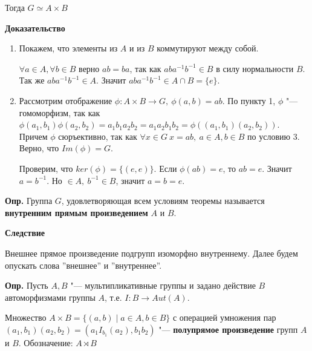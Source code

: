 \documentclass{article}
\begin{document}
Тогда $G \simeq A \times B$

\textbf{Доказательство}
\begin{enumerate}
	\item Покажем, что элементы из $A$ и из $B$ коммутируют между собой.
	
	$\forall a \in A, \forall b \in B$ верно $ab = ba$, так как $aba^{-1}b^{-1} \in B$ в силу нормальности $B$. Так же $aba^{-1}b^{-1} \in A$. Значит $aba^{-1}b^{-1} \in A \cap B = \{e\}$.
	
	\item Рассмотрим отображение $\phi: A \times B \rightarrow G, \  \phi(a,b) = ab$. По пункту 1, $\phi$ "--- гомоморфизм, так как $\phi(a_1, b_1)\phi(a_2, b_2) = a_1b_1a_2b_2 = a_1a_2b_1b_2 = \phi((a_1, b_1)(a_2, b_2))$. Причем $\phi$ сюръективно, так как $\forall x \in G \  x = ab, \  a \in A, b \in B$ по условию 3. Верно, что $Im(\phi) = G$.

	Проверим, что $ker(\phi) = \{(e, e)\}$. Если $\phi(ab) = e$, то $ab = e$. Значит $a = b^{-1}$. Но $ \in A, \   b^{-1} \in B$, значит $a = b = e$.
\end{enumerate}

\vspace{10pt}

\textbf{Опр.} Группа $G$, удовлетворяющая всем условиям теоремы называется \textbf{внутренним прямым произведением} $A$ и $B$.

\vspace{10pt}

\textbf{Следствие}

Внешнее прямое произведение подгрупп изоморфно внутреннему. Далее будем опускать слова ''внешнее'' и ''внутреннее''.

\textbf{Опр.} Пусть $A, B$ "--- мультипликативные группы и задано действие $B$ автоморфизмами группы $A$, т.е. $I: B \rightarrow Aut(A)$.

Множество $A \times B = \{(a, b) \mid a \in A, b \in B\}$ с операцией умножения пар $(a_1, b_1)(a_2, b_2) = (a_1I_{b_1}(a_2), b_1b_2)$ "--- \textbf{полупрямое произведение} групп $A$ и $B$. Обозначение: $A \rtimes B$ 
\end{document}
